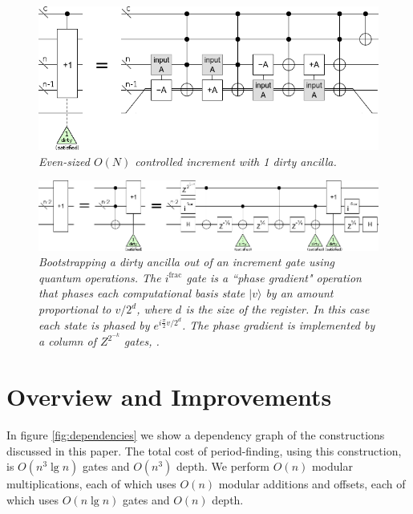 \documentclass[twocolumn]{article}
\begin{document}
\begin{figure}
  \centering
  \includegraphics[width=\linewidth]{assets/controlled-increment-even.png}
  \caption{\em Even-sized $O(N)$ controlled increment with 1 dirty ancilla.}
  \label{fig:controlled-increment-even}
\end{figure}

\begin{figure}
  \centering
  \includegraphics[width=\linewidth]{assets/ancilla-bootstrap.png}
  \caption{\em Bootstrapping a dirty ancilla out of an increment gate using quantum operations.
  The $i^{\text{frac}}$ gate is a ``phase gradient" operation that phases each computational basis state $|v\rangle$ by an amount proportional to $v/2^d$, where $d$ is the size of the register.
  In this case each state is phased by $e^{i \frac{\pi}{2} v/2^d}$.
  The phase gradient is implemented by a column of $Z^{2^{-k}}$ gates, .}
  \label{fig:bootstrap-ancilla}
\end{figure}


\section{Overview and Improvements} \label{sec:costs}

In figure \ref{fig:dependencies} we show a dependency graph of the constructions discussed in this paper.
The total cost of period-finding, using this construction, is $O(n^3 \lg n)$ gates and $O(n^3)$ depth.
We perform $O(n)$ modular multiplications, each of which uses $O(n)$ modular additions and offsets, each of which uses $O(n \lg n)$ gates \cite{haner2016} and $O(n)$ depth.
\end{document}
